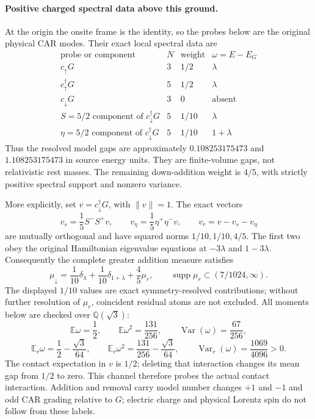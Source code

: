 \paragraph{Positive charged spectral data above this ground.}
At the origin the onsite frame is the identity, so the probes below
are the original physical CAR modes. Their exact local spectral data
are
\[
\begin{array}{c|c|c|c}
 \text{probe or component}&N&\text{weight}&\omega=E-E_G\\ \hline
 c_\uparrow G&3&1/2&\lambda\\
 c_\uparrow^\dagger G&5&1/2&\lambda\\
 c_\downarrow G&3&0&\text{absent}\\
 S=5/2\text{ component of }c_\downarrow^\dagger G&5&1/10&\lambda\\
 \eta=5/2\text{ component of }c_\downarrow^\dagger G&5&1/10&1+\lambda
\end{array}
\]
Thus the resolved model gaps are approximately $0.108253175473$ and
$1.108253175473$ in source energy units. They are finite-volume gaps,
not relativistic rest masses. The remaining down-addition weight is
$4/5$, with strictly positive spectral support and nonzero variance.

More explicitly, set $v=c_\downarrow^\dagger G$, with $\|v\|=1$.
The exact vectors
\[
 v_s=\frac15S^-S^+v,\qquad
 v_\eta=\frac15\eta^+\eta^-v,\qquad
 v_r=v-v_s-v_\eta
\]
are mutually orthogonal and have squared norms $1/10,1/10,4/5$.
The first two obey the original Hamiltonian eigenvalue equations at
$-3\lambda$ and $1-3\lambda$. Consequently the complete greater
addition measure satisfies
\[
 \mu_\downarrow=\frac1{10}\delta_\lambda
   +\frac1{10}\delta_{1+\lambda}+\frac45\mu_r,
 \qquad \operatorname{supp}\mu_r\subset(7/1024,\infty).
\]
The displayed $1/10$ values are exact symmetry-resolved contributions;
without further resolution of $\mu_r$, coincident residual atoms are
not excluded. All moments below are checked over $\mathbb Q(\sqrt3)$:
\[
 \mathbb E\omega=\frac12,\qquad
 \mathbb E\omega^2=\frac{131}{256},\qquad
 \operatorname{Var}(\omega)=\frac{67}{256},
\]
\[
 \mathbb E_r\omega=\frac12-\frac{\sqrt3}{64},\qquad
 \mathbb E_r\omega^2=\frac{131}{256}-\frac{\sqrt3}{64},\qquad
 \operatorname{Var}_r(\omega)=\frac{1069}{4096}>0.
\]
The contact expectation in $v$ is $1/2$; deleting that interaction
changes its mean gap from $1/2$ to zero. This channel therefore probes
the actual contact interaction. Addition and removal carry model
number changes $+1$ and $-1$ and odd CAR grading relative to $G$;
electric charge and physical Lorentz spin do not follow from these
labels.

